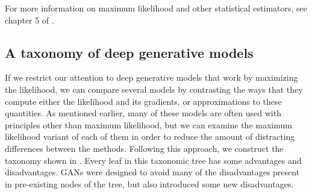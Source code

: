 For more information on maximum likelihood and other statistical estimators,
see chapter 5 of \citet{Goodfellow-et-al-2016}.


\subsection{A taxonomy of deep generative models}

If we restrict our attention to deep generative models that work by maximizing
the likelihood, we can compare several models by contrasting the ways that they
compute either the likelihood and its gradients, or approximations to these
quantities.
As mentioned earlier, many of these models are often used with principles other
than maximum likelihood, but we can examine the maximum likelihood variant of
each of them in order to reduce the amount of distracting differences between
the methods.
Following this approach, we construct the taxonomy shown in .
Every leaf in this taxonomic tree has some advantages and disadvantages.
GANs were designed to avoid many of the disadvantages present in pre-existing
nodes of the tree, but also introduced some new disadvantages.

